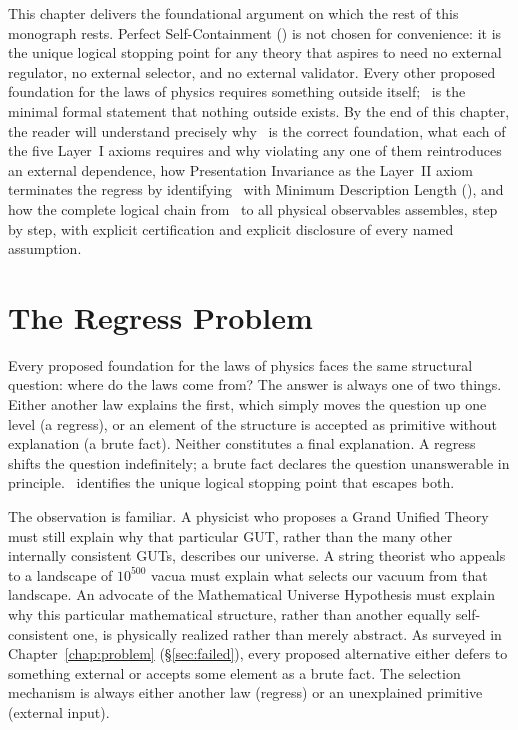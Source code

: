\documentclass[11pt,openany]{book}
\theoremstyle{remark}
\newcommand{\MDL}{\text{MDL}}
\newcommand{\PSC}{\text{PSC}}
\begin{document}
This chapter delivers the foundational argument on which the rest of this monograph
rests. Perfect Self-Containment (\PSC) is not chosen for convenience: it is the unique
logical stopping point for any theory that aspires to need no external regulator, no
external selector, and no external validator. Every other proposed foundation for the
laws of physics requires something outside itself; \PSC\ is the minimal formal statement
that nothing outside exists. By the end of this chapter, the reader will understand
precisely why \PSC\ is the correct foundation, what each of the five Layer~I axioms
requires and why violating any one of them reintroduces an external dependence, how
Presentation Invariance as the Layer~II axiom terminates the regress by identifying
\PSC\ with Minimum Description Length (\MDL), and how the complete logical chain from
\PSC\ to all physical observables assembles, step by step, with explicit certification
and explicit disclosure of every named assumption.

\section{The Regress Problem}
\label{sec:regress}

Every proposed foundation for the laws of physics faces the same structural question:
where do the laws come from? The answer is always one of two things. Either another law
explains the first, which simply moves the question up one level (a regress), or an
element of the structure is accepted as primitive without explanation (a brute fact).
Neither constitutes a final explanation. A regress shifts the question indefinitely; a
brute fact declares the question unanswerable in principle. \PSC\ identifies the unique
logical stopping point that escapes both.

The observation is familiar. A physicist who proposes a Grand Unified Theory must still
explain why that particular GUT, rather than the many other internally consistent GUTs,
describes our universe. A string theorist who appeals to a landscape of $10^{500}$
vacua must explain what selects our vacuum from that landscape. An advocate of the
Mathematical Universe Hypothesis must explain why this particular mathematical
structure, rather than another equally self-consistent one, is physically realized
rather than merely abstract. As surveyed in Chapter~\ref{chap:problem}
(\S\ref{sec:failed}), every proposed alternative either defers to something external or
accepts some element as a brute fact. The selection mechanism is always either another
law (regress) or an unexplained primitive (external input).
\end{document}
